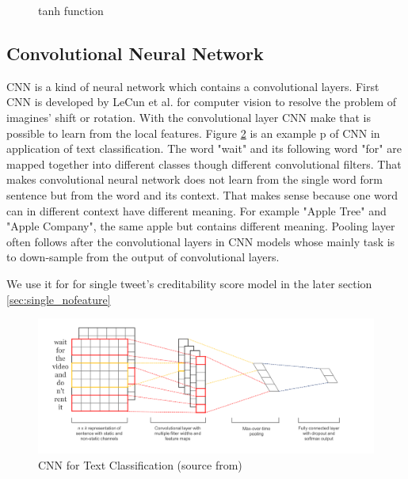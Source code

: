  \begin{figure}[h]
\center
{}
   \caption{tanh function}
\label{fig:tanh}
\end{figure}
\newpage
 \subsection{Convolutional Neural Network} %
CNN is a kind of neural network which contains a convolutional layers. First CNN is developed by LeCun et al. \cite{lecun1989backpropagation} for computer vision to resolve the problem of imagines' shift or rotation. With the convolutional layer CNN make that is possible to learn from the local features. Figure \ref{fig:cnn2} is an example p of CNN in application of text classification. The word "wait" and its following word "for" are mapped together into different classes though different convolutional filters. That makes convolutional neural network does not learn from the single word form sentence but from the word and its context. That makes sense because one word can in different context have different meaning. For example "Apple Tree" and "Apple Company", the same apple but contains different meaning. 
 Pooling layer often follows after the convolutional layers in CNN models whose mainly task is to down-sample from the output of convolutional layers.  
 
 We use it for for single tweet's creditability score model in the later section \ref{sec:single_nofeature}
   


 \begin{figure}[!h]
\centering
\includegraphics[width=1\columnwidth]{images/CNN.png}
\caption{CNN for Text Classification (source from\cite{kim2014convolutional}) }
\label{fig:cnn2}
\end{figure}



